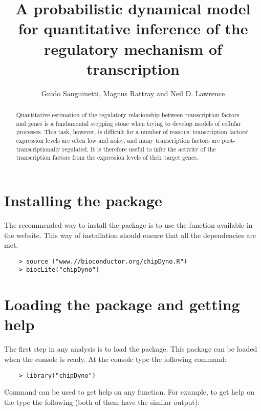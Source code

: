 \documentclass{article}
\title{A probabilistic dynamical model for quantitative inference of the regulatory mechanism of transcription}
\author{Guido Sanguinetti, Magnus Rattray and Neil D. Lawrence}
\begin{document}


\maketitle

\begin{abstract}
Quantitative estimation of the regulatory relationship between transcription factors and genes is a fundamental stepping stone when trying to develop models of cellular processes. This task, however, is difficult for a number of reasons: transcription factors` expression levels are often low and noisy, and many transcription factors are post-transcriptionally regulated. It is therefore useful to infer the activity of the transcription factors from the expression levels of their target genes.
\end{abstract}

\tableofcontents

\section{Installing the  package}
The recommended way to install the \Bioconductor{} package  is to use the  function available in the \Bioconductor{} website. This way of installation should ensure that all the dependencies are met.

\begin{verbatim}
    > source ("www.//bioconductor.org/chipDyno.R")
    > biocLite("chipDyno")
\end{verbatim}


\section{Loading the package and getting help}
The first step in any  analysis is to load the package. This package can be loaded when the \R{} console is ready. At the \R{} console type the following command:

\begin{verbatim}
    > library("chipDyno")
\end{verbatim}

Command  can be used to get help on any function. For example, to get help on the  type the following (both of them have the similar output):
\end{document}
